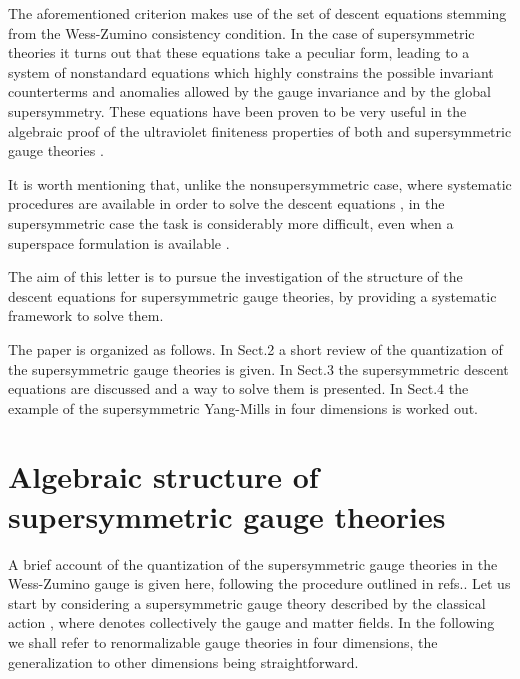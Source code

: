 \documentclass[a4paper,12pt]{article}
\begin{document}
The aforementioned criterion makes use of the set of descent equations
stemming from the Wess-Zumino consistency condition. In the case of
supersymmetric theories it turns out that these equations take a peculiar
form, leading to a system of nonstandard equations which highly constrains
the possible invariant counterterms and anomalies allowed by the gauge
invariance and by the global supersymmetry. These equations have been proven
to be very useful in the algebraic proof of the ultraviolet finiteness
properties of both \coordHE{} \cite{n2} and \coordHE{} supersymmetric gauge theories 
\cite{n4,n41}.

It is worth mentioning that, unlike the nonsupersymmetric case, where
systematic procedures are available in order to solve the descent equations 
\cite{book,pr}, in the supersymmetric case the task is considerably more
difficult, even when a superspace formulation is available \cite{sp}.

The aim of this letter is to pursue the investigation of the structure of
the descent equations for supersymmetric gauge theories, by providing a
systematic framework to solve them.

The paper is organized as follows. In Sect.2 a short review of the
quantization of the supersymmetric gauge theories is given. In Sect.3 the
supersymmetric descent equations are discussed and a way to solve them is
presented. In Sect.4 the example of the \coordHE{} supersymmetric Yang-Mills in
four dimensions is worked out.

\section{Algebraic structure of supersymmetric gauge theories}

A brief account of the quantization of the supersymmetric gauge theories in
the Wess-Zumino gauge is given here, following the procedure outlined in
refs.\cite{n4,mg,mp}. Let us start by considering a supersymmetric gauge
theory described by the classical action \coordHE{},
where \myHighlight{$\Phi $}\coordHE{} denotes collectively the gauge and matter fields. In the
following we shall refer to renormalizable gauge theories in four
dimensions, the generalization to other dimensions being straightforward.
\end{document}
